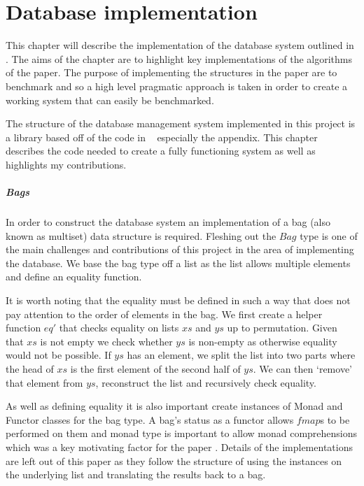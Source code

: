 \chapter{Database implementation}\label{chap:database}
This chapter will describe the implementation of the database system outlined in
\relalg{}. The aims of the chapter are to highlight key implementations of the
algorithms of the paper. The purpose of implementing the structures in the paper
are to benchmark and so a high level pragmatic approach is taken in order to
create a working system that can easily be benchmarked.

The structure of the database management system implemented in this
project is a library based off of the code in
\relalg{}~\cite{RelationalAlgebraByWayOfAdjunctions} especially the appendix.
This chapter describes the code needed to create a fully functioning
system as well as highlights my contributions.

\paragraph{Bags} In order to construct the database system an
implementation of a bag (also known as multiset) data structure is
required. Fleshing out the $Bag$ type is one of the main challenges and
contributions of this project in the area of implementing the database. We
base the bag type off a list as the list allows multiple elements and
define an equality function.



\noindent
It is worth noting that the equality must be defined in such a way that does not
pay attention to the order of elements in the bag. We first create a helper
function $eq'$ that checks equality on lists $xs$ and $ys$ up to permutation.
Given that $xs$ is not empty we check whether $ys$ is non-empty as otherwise
equality would not be possible. If $ys$ has an element, we split the list into
two parts where the head of $xs$ is the first element of the second half of
$ys$. We can then `remove' that element from $ys$, reconstruct the list and
recursively check equality.

As well as defining equality it is also important create instances of Monad and
Functor classes for the bag type. A bag's status as a functor allows $fmap$s to be performed on
them and monad type is important to allow monad comprehensions which was a key
motivating factor for the paper \relalg{}. Details of the implementations are
left out of this paper as they follow the structure of using the instances on
the underlying list and translating the results back to a bag.
